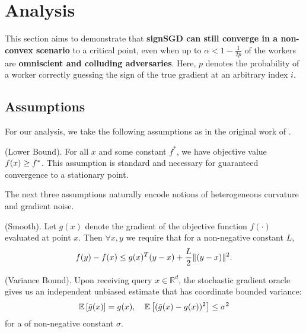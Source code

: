 \section{Analysis}
\label{sec:theoretical-contribution}

This section aims to demonstrate that \textbf{signSGD can still converge in a non-convex scenario} to a critical point, even when up to $\alpha < 1 - \frac{1}{2p}$ of the workers are \textbf{omniscient and colluding adversaries}. Here, $p$ denotes the probability of a worker correctly guessing the sign of the true gradient at an arbitrary index $i$.


\subsection{Assumptions}

For our analysis, we take the following assumptions as in the original work of \cite{bernstein2018signsgd}.

\begin{assumption} \textnormal{ (Lower Bound).}
    For all $x$ and some constant $f^*$, we have objective value $f(x) \geq f^*$. This assumption is standard and necessary for guaranteed convergence to a stationary point.
\end{assumption}

The next three assumptions naturally encode notions of heterogeneous curvature and gradient noise.

\begin{assumption} \textnormal{(Smooth).}
    Let $g(x)$ denote the gradient of the objective function $f(\cdot)$ evaluated at point $x$. Then $\forall x, y$ we require that for a non-negative constant $L$,
    \begin{equation*}
    f(y)  - f(x)  \leq  g(x)^T(y-x) + \frac{L}{2} \|(y - x)\|^2.
    \end{equation*}
\end{assumption}

\begin{assumption} \textnormal{(Variance Bound).}
    Upon receiving query $x \in \mathbb{R}^d$, the stochastic gradient oracle gives us an independent unbiased estimate \gradest{} that has coordinate bounded variance:
    \begin{equation*}
    \mathbb{E}\left[\tilde{g}(x)\right] = g(x), \quad \mathbb{E}\left[(\tilde{g}(x) - g(x))^2\right] \leq \sigma^2
    \end{equation*}
for a of non-negative constant $\sigma$.
\end{assumption}

